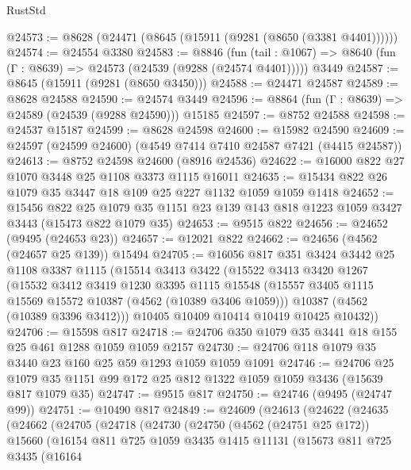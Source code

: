 \begin{lexlean}{RustStd}
\begin{coremodule}
@24573 := @8628 (@24471 (@8645 (@15911 (@9281 (@8650 (@3381 @4401))))))
@24574 := @24554 @3380
@24583 := @8846
    (fun (tail : @1067) => @8640 (fun (Γ : @8639) => @24573 (@24539 (@9288 (@24574 @4401)))))
    @3449
@24587 := @8645 (@15911 (@9281 (@8650 @3450)))
@24588 := @24471 @24587
@24589 := @8628 @24588
@24590 := @24574 @3449
@24596 := @8864 (fun (Γ : @8639) => @24589 (@24539 (@9288 @24590))) @15185
@24597 := @8752 @24588
@24598 := @24537 @15187
@24599 := @8628 @24598
@24600 := @15982 @24590
@24609 := @24597 (@24599 @24600) (@4549 @7414 @7410 @24587 @7421 (@4415 @24587))
@24613 := @8752 @24598 @24600 (@8916 @24536)
@24622 := @16000 @822 @27 @1070 @3448 @25 @1108 @3373 @1115 @16011
@24635 := @15434 @822 @26 @1079 @35 @3447 @18 @109 @25 @227 @1132 @1059 @1059 @1418
@24652 := @15456
    @822
    @25
    @1079
    @35
    @1151
    @23
    @139
    @143
    @818
    @1223
    @1059
    @3427
    @3443
    (@15473 @822 @1079 @35)
@24653 := @9515 @822
@24656 := @24652 (@9495 (@24653 @23))
@24657 := @12021 @822
@24662 := @24656 (@4562 (@24657 @25 @139)) @15494
@24705 := @16056
    @817
    @351
    @3424
    @3442
    @25
    @1108
    @3387
    @1115
    (@15514
      @3413
      @3422
      (@15522
        @3413
        @3420
        @1267
        (@15532
          @3412
          @3419
          @1230
          @3395
          @1115
          @15548
          (@15557 @3405 @1115 @15569 @15572 @10387 (@4562 (@10389 @3406 @1059)))
          @10387
          (@4562 (@10389 @3396 @3412)))
        @10405
        @10409
        @10414
        @10419
        @10425
        @10432))
@24706 := @15598 @817
@24718 := @24706 @350 @1079 @35 @3441 @18 @155 @25 @461 @1288 @1059 @1059 @2157
@24730 := @24706 @118 @1079 @35 @3440 @23 @160 @25 @59 @1293 @1059 @1059 @1091
@24746 := @24706
    @25
    @1079
    @35
    @1151
    @99
    @172
    @25
    @812
    @1322
    @1059
    @1059
    @3436
    (@15639 @817 @1079 @35)
@24747 := @9515 @817
@24750 := @24746 (@9495 (@24747 @99))
@24751 := @10490 @817
@24849 := @24609
    (@24613
      (@24622
        (@24635
          (@24662
            (@24705
              (@24718
                (@24730
                  (@24750
                    (@4562 (@24751 @25 @172))
                    @15660
                    (@16154
                      @811
                      @725
                      @1059
                      @3435
                      @1415
                      @11131
                      (@15673
                        @811
                        @725
                        @3435
                        (@16164

\end{coremodule}
\end{lexlean}

